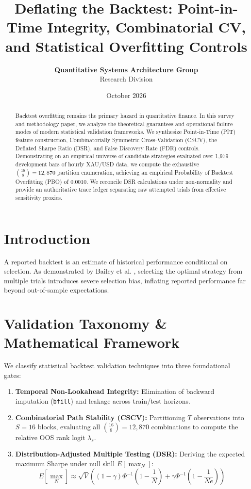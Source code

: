 \documentclass[journal,10pt,twocolumn]{article}
\title{\textbf{Deflating the Backtest: Point-in-Time Integrity, Combinatorial CV,\\and Statistical Overfitting Controls}}
\author{\textbf{Quantitative Systems Architecture Group}\\Research Division}
\date{October 2026}
\begin{document}
\maketitle

\begin{abstract}
Backtest overfitting remains the primary hazard in quantitative finance. In this survey and methodology paper, we analyze the theoretical guarantees and operational failure modes of modern statistical validation frameworks. We synthesize Point-in-Time (PIT) feature construction, Combinatorially Symmetric Cross-Validation (CSCV), the Deflated Sharpe Ratio (DSR), and False Discovery Rate (FDR) controls. Demonstrating on an empirical universe of candidate strategies evaluated over 1,979 development bars of hourly XAU/USD data, we compute the exhaustive $\binom{16}{8} = 12,870$ partition enumeration, achieving an empirical Probability of Backtest Overfitting (PBO) of 0.0010. We reconcile DSR calculations under non-normality and provide an authoritative trace ledger separating raw attempted trials from effective sensitivity proxies.
\end{abstract}

\section{Introduction}
A reported backtest is an estimate of historical performance conditional on selection. As demonstrated by Bailey et al. \cite{bailey2014deflated, bailey2017probability}, selecting the optimal strategy from multiple trials introduces severe selection bias, inflating reported performance far beyond out-of-sample expectations.

\section{Validation Taxonomy \& Mathematical Framework}
We classify statistical backtest validation techniques into three foundational gates:
\begin{enumerate}
    \item \textbf{Temporal Non-Lookahead Integrity:} Elimination of backward imputation (\texttt{bfill}) and leakage across train/test horizons.
    \item \textbf{Combinatorial Path Stability (CSCV):} Partitioning $T$ observations into $S=16$ blocks, evaluating all $\binom{16}{8} = 12,870$ combinations to compute the relative OOS rank logit $\lambda_s$.
    \item \textbf{Distribution-Adjusted Multiple Testing (DSR):} Deriving the expected maximum Sharpe under null skill $E[\max_N]$:
    \begin{equation}
        E[\max_N] \approx \sqrt{V} \left((1-\gamma) \Phi^{-1}\left(1-\frac{1}{N}\right) + \gamma \Phi^{-1}\left(1-\frac{1}{Ne}\right)\right)
    \end{equation}
\end{enumerate}
\end{document}
